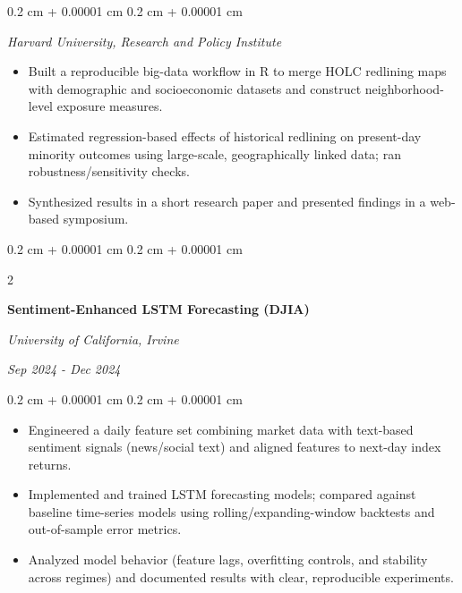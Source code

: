 \documentclass[10pt, letterpaper]{article}
\newenvironment{highlights}{
    \begin{itemize}[
        topsep=0.10 cm,
        parsep=0.10 cm,
        partopsep=0pt,
        itemsep=0pt,
        leftmargin=0.4 cm + 10pt
    ]
}{
    \end{itemize}
} %
\newenvironment{onecolentry}{
    \begin{adjustwidth}{
        0.2 cm + 0.00001 cm
    }{
        0.2 cm + 0.00001 cm
    }
}{
    \end{adjustwidth}
} %
\newenvironment{twocolentry}[2][]{
    \onecolentry
    \def\secondColumn{#2}
    \setcolumnwidth{\fill, 4.5 cm}
    \begin{paracol}{2}
}{
    \switchcolumn \raggedleft \secondColumn
    \end{paracol}
    \endonecolentry
} %
\begin{document}
        \vspace{0.10 cm}
        \begin{onecolentry}
        \textit{Harvard University, Research and Policy Institute}
            \begin{highlights}
                \item Built a reproducible big-data workflow in R to merge HOLC redlining maps with demographic and socioeconomic datasets and construct neighborhood-level exposure measures.
                \item Estimated regression-based effects of historical redlining on present-day minority outcomes using large-scale, geographically linked data; ran robustness/sensitivity checks.
                \item Synthesized results in a short research paper and presented findings in a web-based symposium.
            \end{highlights}
        \end{onecolentry}

        \begin{twocolentry}{
        \textit{Sep 2024 - Dec 2024}}
            \textbf{Sentiment-Enhanced LSTM Forecasting (DJIA)}

            \textit{University of California, Irvine}
        \end{twocolentry}
        \vspace{0.10 cm}
        \begin{onecolentry}
            \begin{highlights}
                \item Engineered a daily feature set combining market data with text-based sentiment signals (news/social text) and aligned features to next-day index returns.
                \item Implemented and trained LSTM forecasting models; compared against baseline time-series models using rolling/expanding-window backtests and out-of-sample error metrics.
                \item Analyzed model behavior (feature lags, overfitting controls, and stability across regimes) and documented results with clear, reproducible experiments.
            \end{highlights}
        \end{onecolentry}

\end{document}

